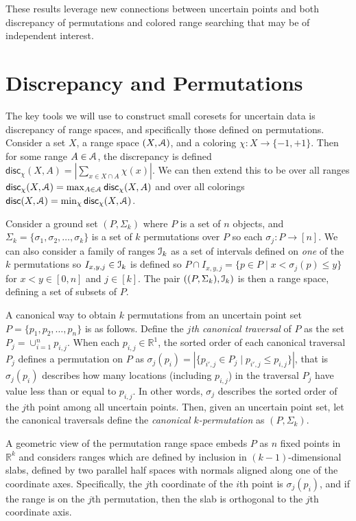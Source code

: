 \documentclass[11pt]{myclass}
\newcommand{\Eu}[1]{\ensuremath{\EuScript{#1}}}
\newcommand{\bl}[1]{\ensuremath{\mathbb{#1}}}
\newcommand{\disc}{\textsf{disc}}
\begin{document}
These results leverage new connections between uncertain points and both discrepancy of permutations and colored range searching that may be of independent interest.  

\section{Discrepancy and Permutations}

The key tools we will use to construct small coresets for uncertain data is discrepancy of range spaces, and specifically those defined on permutations.  
Consider a set $X$, a range space $(X,\Eu{A})$, and a coloring $\chi : X \to \{-1, +1\}$.  
Then for some range $A \in \Eu{A}$, the discrepancy is defined 
$\disc_\chi(X,A) = |\sum_{x \in X \cap A} \chi(x)|$.  We can then extend this to be over all ranges $\disc_\chi(X,\Eu{A}) = \max_{A \in \Eu{A}} \disc_\chi(X,A)$ and over all colorings $\disc(X,\Eu{A}) = \min_\chi \disc_\chi(X,\Eu{A})$.  

Consider a ground set $(P,\Sigma_k)$ where $P$ is a set of $n$ objects, and $\Sigma_k = \{\sigma_1, \sigma_2, \ldots, \sigma_k\}$ is a set of $k$ permutations over $P$ so each $\sigma_j : P \to [n]$.  We can also consider a family of ranges $\Eu{I}_k$ as a set of intervals defined on \emph{one} of the $k$ permutations so $I_{x,y,j} \in \Eu{I}_k$ is defined so $P \cap I_{x,y,j} = \{p \in P \mid x < \sigma_j(p) \leq y\}$ for $x < y \in [0,n]$ and $j \in [k]$. The pair $((P,\Sigma_k),\Eu{I}_k)$ is then a range space, defining a set of subsets of $P$.  

A canonical way to obtain $k$ permutations from an uncertain point set $P = \{p_1, p_2, \ldots, p_n\}$ is as follows.  
Define the \emph{$j$th canonical traversal} of $P$ as the set $P_j = \cup_{i=1}^n p_{i,j}$. When each $p_{i,j} \in \bl{R}^1$, the sorted order of each canonical traversal $P_j$ defines a permutation on $P$ as $\sigma_j(p_i) = |\{p_{i',j} \in P_j \mid p_{i',j} \leq p_{i,j} \} |$, that is $\sigma_j(p_i)$ describes how many locations (including $p_{i,j}$) in the traversal $P_j$ have value less than or equal to $p_{i,j}$.  In other words, $\sigma_j$ describes the sorted order of the $j$th point among all uncertain points.  Then, given an uncertain point set, let the canonical traversals define the \emph{canonical $k$-permutation} as $(P,\Sigma_k)$.  

A geometric view of the permutation range space embeds $P$ as $n$ fixed points in $\bl{R}^k$ and considers ranges which are defined by inclusion in $(k-1)$-dimensional slabs, defined by two parallel half spaces with normals aligned along one of the coordinate axes.  Specifically, the $j$th coordinate of the $i$th point is $\sigma_j(p_i)$, and if the range is on the $j$th permutation, then the slab is orthogonal to the $j$th coordinate axis.  
\end{document}
